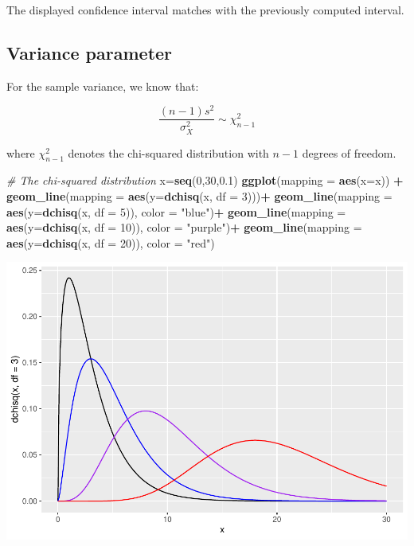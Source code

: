 \documentclass[
]{article}
\newenvironment{Shaded}{\begin{snugshade}}{\end{snugshade}}
\newcommand{\AttributeTok}[1]{\textcolor[rgb]{0.13,0.29,0.53}{#1}}
\newcommand{\CommentTok}[1]{\textcolor[rgb]{0.56,0.35,0.01}{\textit{#1}}}
\newcommand{\DecValTok}[1]{\textcolor[rgb]{0.00,0.00,0.81}{#1}}
\newcommand{\FloatTok}[1]{\textcolor[rgb]{0.00,0.00,0.81}{#1}}
\newcommand{\FunctionTok}[1]{\textcolor[rgb]{0.13,0.29,0.53}{\textbf{#1}}}
\newcommand{\NormalTok}[1]{#1}
\newcommand{\OtherTok}[1]{\textcolor[rgb]{0.56,0.35,0.01}{#1}}
\newcommand{\SpecialCharTok}[1]{\textcolor[rgb]{0.81,0.36,0.00}{\textbf{#1}}}
\newcommand{\StringTok}[1]{\textcolor[rgb]{0.31,0.60,0.02}{#1}}
\begin{document}
The displayed confidence interval matches with the previously computed
interval.

\hypertarget{variance-parameter}{%
\subsection{Variance parameter}\label{variance-parameter}}

For the sample variance, we know that:

\[
\frac{(n-1)s^2}{\sigma^2_X} \sim \chi^2_{n-1}
\]

where \(\chi^2_{n-1}\) denotes the chi-squared distribution with \(n-1\)
degrees of freedom.

\begin{Shaded}
\begin{Highlighting}[]
\CommentTok{\# The chi{-}squared distribution}
\NormalTok{x}\OtherTok{=}\FunctionTok{seq}\NormalTok{(}\DecValTok{0}\NormalTok{,}\DecValTok{30}\NormalTok{,}\FloatTok{0.1}\NormalTok{)}
\FunctionTok{ggplot}\NormalTok{(}\AttributeTok{mapping =} \FunctionTok{aes}\NormalTok{(}\AttributeTok{x=}\NormalTok{x)) }\SpecialCharTok{+}
  \FunctionTok{geom\_line}\NormalTok{(}\AttributeTok{mapping =} \FunctionTok{aes}\NormalTok{(}\AttributeTok{y=}\FunctionTok{dchisq}\NormalTok{(x, }\AttributeTok{df =} \DecValTok{3}\NormalTok{)))}\SpecialCharTok{+}
  \FunctionTok{geom\_line}\NormalTok{(}\AttributeTok{mapping =} \FunctionTok{aes}\NormalTok{(}\AttributeTok{y=}\FunctionTok{dchisq}\NormalTok{(x, }\AttributeTok{df =} \DecValTok{5}\NormalTok{)), }\AttributeTok{color =} \StringTok{"blue"}\NormalTok{)}\SpecialCharTok{+}
  \FunctionTok{geom\_line}\NormalTok{(}\AttributeTok{mapping =} \FunctionTok{aes}\NormalTok{(}\AttributeTok{y=}\FunctionTok{dchisq}\NormalTok{(x, }\AttributeTok{df =} \DecValTok{10}\NormalTok{)), }\AttributeTok{color =} \StringTok{"purple"}\NormalTok{)}\SpecialCharTok{+}
  \FunctionTok{geom\_line}\NormalTok{(}\AttributeTok{mapping =} \FunctionTok{aes}\NormalTok{(}\AttributeTok{y=}\FunctionTok{dchisq}\NormalTok{(x, }\AttributeTok{df =} \DecValTok{20}\NormalTok{)), }\AttributeTok{color =} \StringTok{"red"}\NormalTok{)}
\end{Highlighting}
\end{Shaded}

\includegraphics{Estimation-and-Confidence-intervals_files/figure-latex/unnamed-chunk-20-1.pdf}
\end{document}
